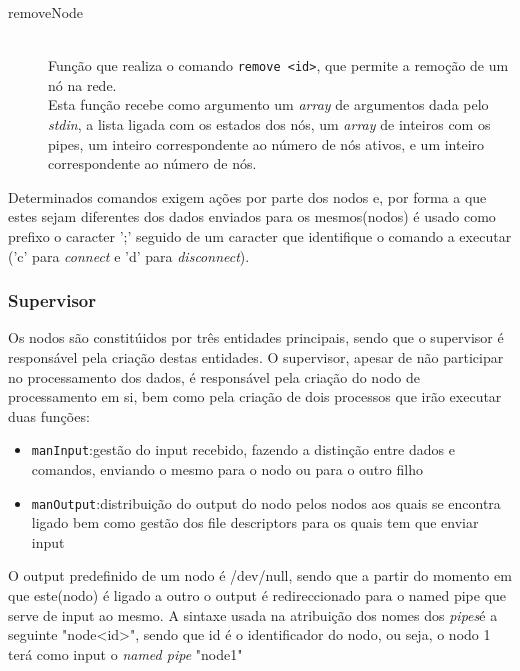 \documentclass[12pt]{article}
\begin{document}
\begin{description}
\item[removeNode] \hfill \\
Função que realiza o comando \texttt{remove <id>}, que permite a remoção de um nó na rede. 
\\Esta função recebe como argumento um \textit{array} de argumentos dada pelo \textit{stdin}, a lista ligada com os estados dos nós, um \textit{array} de inteiros com os pipes, um inteiro correspondente ao número de nós ativos, e um inteiro correspondente ao número de nós.
\end{description}

Determinados comandos exigem ações por parte dos nodos e, por forma a que estes sejam diferentes dos dados enviados para os mesmos(nodos) é usado como prefixo o caracter ';' seguido de um caracter que identifique o comando a executar ('c' para \textit{connect} e 'd' para \textit{disconnect}).

\subsubsection{Supervisor}
Os nodos são constitúidos por três entidades principais, sendo que o supervisor é responsável pela criação destas entidades.
O supervisor, apesar de não participar no processamento dos dados, é responsável pela criação do nodo de processamento em si, bem como pela criação de dois processos que irão executar duas funções: 
\begin{itemize}
\item \texttt{manInput}:gestão do input recebido, fazendo a distinção entre dados e comandos, enviando o mesmo para o nodo ou para o outro filho
\item \texttt{manOutput}:distribuição do output do nodo pelos nodos aos quais se encontra ligado bem como gestão dos file descriptors para os quais tem que enviar input
\end{itemize}
O output predefinido de um nodo é /dev/null, sendo que a partir do momento em que este(nodo) é ligado a outro o output é redireccionado para o named pipe que serve de input ao mesmo. A sintaxe usada na atribuição dos nomes dos \textit{pipes}é a seguinte "node<id>", sendo que id é o identificador do nodo, ou seja, o nodo 1 terá como input o \textit{named pipe} "node1"
\end{document}
